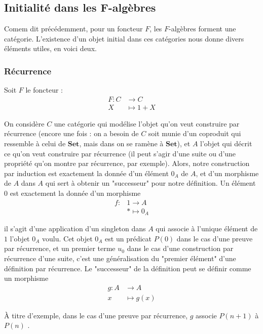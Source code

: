 \documentclass{article}
\begin{document}
\subsection{Initialité dans les F-algèbres}

Comem dit précédemment, pour un foncteur $F$, les $F$-algèbres forment une catégorie. L'existence d'un objet initial dans ces catégories nous donne divers éléments utiles, en voici deux. 

\subsubsection{Récurrence}

Soit $F$ le foncteur : 
\begin{align*}
    F : C & \rightarrow C \\ 
    X & \mapsto 1 + X
\end{align*}

On considère $C$ une catégorie qui modélise l'objet qu'on veut construire par récurrence (encore une fois : on a besoin de $C$ soit munie d'un coproduit qui ressemble à celui de $\mathbf{Set}$, mais dans on se ramène à $\mathbf{Set}$), et $A$ l'objet qui décrit ce qu'on veut construire par récurrence (il peut s'agir d'une suite ou d'une propriété qu'on montre par récurrence, par exemple). Alors, notre construction par induction est exactement la donnée d'un élément $0_A$ de $A$, et d'un morphisme de $A$ dans $A$ qui sert à obtenir un "successeur" pour notre définition. Un élément $0$ est exactement la donnée d'un morphisme  
\begin{align*}
f : & 1  \rightarrow A \\
    & * \mapsto 0_A
\end{align*}

il s'agit d'une application d'un singleton dans $A$ qui associe à l'unique élément de $1$ l'objet $0_A$ voulu. Cet objet $0_A$ est un prédicat $P(0)$ dans le cas d'une preuve par récurrence, et un premier terme $u_0$ dans le cas d'une construction par récurrence d'une suite, c'est une généralisation du "premier élément" d'une définition par récurrence. Le "successeur" de la définition peut se définir comme un morphisme 
\begin{align*}
    g : A &  \rightarrow A \\ 
        x & \mapsto g(x)
\end{align*}

À titre d'exemple, dans le cas d'une preuve par récurrence, $g$ associe $P(n+1)$ à $P(n)$ .
    
\end{document}
